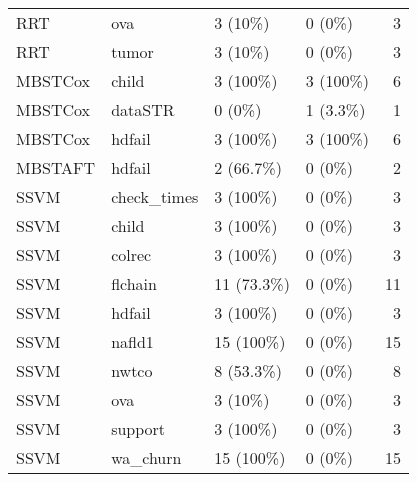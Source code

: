 \begin{table}
\begin{tabular}[t]{llllr}
RRT & ova & 3 (10\%) & 0 (0\%) & 3\\
RRT & tumor & 3 (10\%) & 0 (0\%) & 3\\
MBSTCox & child & 3 (100\%) & 3 (100\%) & 6\\
MBSTCox & dataSTR & 0 (0\%) & 1 (3.3\%) & 1\\
MBSTCox & hdfail & 3 (100\%) & 3 (100\%) & 6\\
MBSTAFT & hdfail & 2 (66.7\%) & 0 (0\%) & 2\\
SSVM & check\_times & 3 (100\%) & 0 (0\%) & 3\\
SSVM & child & 3 (100\%) & 0 (0\%) & 3\\
SSVM & colrec & 3 (100\%) & 0 (0\%) & 3\\
SSVM & flchain & 11 (73.3\%) & 0 (0\%) & 11\\
SSVM & hdfail & 3 (100\%) & 0 (0\%) & 3\\
SSVM & nafld1 & 15 (100\%) & 0 (0\%) & 15\\
SSVM & nwtco & 8 (53.3\%) & 0 (0\%) & 8\\
SSVM & ova & 3 (10\%) & 0 (0\%) & 3\\
SSVM & support & 3 (100\%) & 0 (0\%) & 3\\
SSVM & wa\_churn & 15 (100\%) & 0 (0\%) & 15\\
\bottomrule
\end{tabular}
\end{table}
